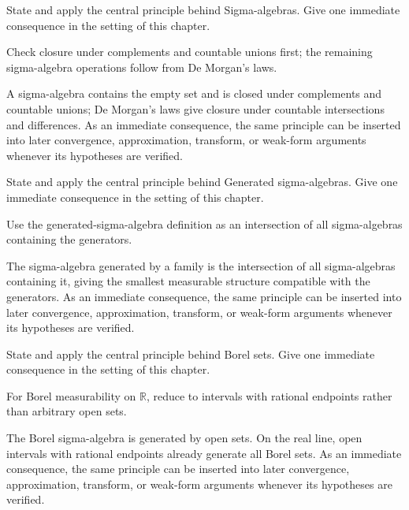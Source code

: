 \begin{exercise}\label{exr:iii01-01}
State and apply the central principle behind Sigma-algebras. Give one immediate consequence in the setting of this chapter.
\end{exercise}
\begin{hint}
Check closure under complements and countable unions first; the remaining sigma-algebra operations follow from De Morgan's laws.
\end{hint}
\begin{solution}
A sigma-algebra contains the empty set and is closed under complements and countable unions; De Morgan's laws give closure under countable intersections and differences. As an immediate consequence, the same principle can be inserted into later convergence, approximation, transform, or weak-form arguments whenever its hypotheses are verified.
\end{solution}

\begin{exercise}\label{exr:iii01-02}
State and apply the central principle behind Generated sigma-algebras. Give one immediate consequence in the setting of this chapter.
\end{exercise}
\begin{hint}
Use the generated-sigma-algebra definition as an intersection of all sigma-algebras containing the generators.
\end{hint}
\begin{solution}
The sigma-algebra generated by a family is the intersection of all sigma-algebras containing it, giving the smallest measurable structure compatible with the generators. As an immediate consequence, the same principle can be inserted into later convergence, approximation, transform, or weak-form arguments whenever its hypotheses are verified.
\end{solution}

\begin{exercise}\label{exr:iii01-03}
State and apply the central principle behind Borel sets. Give one immediate consequence in the setting of this chapter.
\end{exercise}
\begin{hint}
For Borel measurability on \(\mathbb R\), reduce to intervals with rational endpoints rather than arbitrary open sets.
\end{hint}
\begin{solution}
The Borel sigma-algebra is generated by open sets. On the real line, open intervals with rational endpoints already generate all Borel sets. As an immediate consequence, the same principle can be inserted into later convergence, approximation, transform, or weak-form arguments whenever its hypotheses are verified.
\end{solution}

